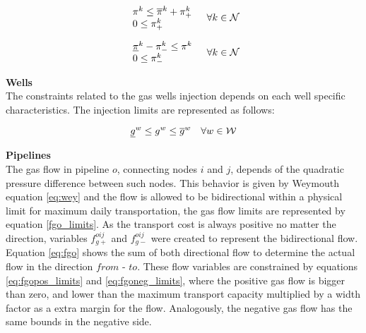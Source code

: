 \begin{equation}
\begin{array}{l}
 \pi^{k} \le \overline{\pi}^{k} + \pi^{k}_{+}\\
 0 \le \pi^{k}_{+}\\
\end{array} 
\quad \forall k  \in {\cal{N}}\\ 
\label{overp}
\end{equation}

\begin{equation}
\begin{array}{l}
\underline{\pi}^{k} - \pi^{k}_{-} \le \pi^{k}\\
0 \le \pi^{k}_{-}\\
\end{array} 
\quad \forall k  \in {\cal{N}}\\ 
\label{underp}
\end{equation}

\textbf{Wells}\\

The constraints related to the gas wells injection depends on each well specific characteristics. The injection limits are represented as follows:

\begin{equation}
\underline{g}^{w} \le g^{w} \le \overline{g}^{w} \quad \forall w \in \cal{W}
\label{eq:g_limits}
\end{equation}

\textbf{Pipelines} \\

The gas flow in pipeline $o$, connecting nodes $i$ and $j$, depends of the quadratic pressure difference between such nodes. This behavior is given by Weymouth equation \ref{eq:wey} and the flow is allowed to be bidirectional within a physical limit for maximum daily transportation, the gas flow limits are represented by equation \ref{fgo_limits}. As the transport cost is always positive no matter the direction, variables $f^{oij}_{g+}$ and $f^{oij}_{g-}$ were created to represent the bidirectional flow. Equation \ref{eq:fgo} shows the sum of both directional flow to determine the actual flow in the direction $from$ - $to$. These flow variables are constrained by equations \ref{eq:fgopos_limits} and \ref{eq:fgoneg_limits}, where the positive gas flow is bigger than zero, and lower than the maximum transport capacity multiplied by a width factor as a extra margin for the flow. Analogously, the negative gas flow has the same bounds in the negative side.


